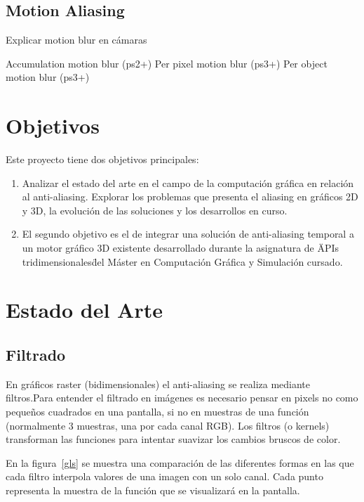 \documentclass[withindex, glossary]{cam-thesis}
\begin{document}
\section{Motion Aliasing}
Explicar motion blur en cámaras

Accumulation motion blur (ps2+)
Per pixel motion blur (ps3+)
Per object motion blur (ps3+)

\chapter{Objetivos}

Este proyecto tiene dos objetivos principales:

\begin{enumerate}
    \item Analizar el estado del arte en el campo de la computación gráfica en relación al anti-aliasing. Explorar los problemas que presenta el aliasing en gráficos 2D y 3D, la evolución de las soluciones y los desarrollos en curso.
    \item El segundo objetivo es el de integrar una solución de anti-aliasing temporal a un motor gráfico 3D existente desarrollado durante la asignatura de \"APIs tridimensionales\" del Máster en Computación Gráfica y Simulación cursado.
\end{enumerate}

\chapter{Estado del Arte}

\section{Filtrado}
\label{filtros}

En gráficos raster (bidimensionales) el anti-aliasing se realiza mediante filtros.Para entender el filtrado en imágenes es necesario pensar en pixels no como pequeños cuadrados en una pantalla, si no en muestras de una función (normalmente 3 muestras, una por cada canal RGB)\cite{Smith95apixel}. Los filtros (o kernels) transforman las funciones para intentar suavizar los cambios bruscos de color.

En la figura~\ref{gls} se muestra una comparación de las diferentes formas en las que cada filtro interpola valores de una imagen con un solo canal. Cada punto representa la muestra de la función que se visualizará en la pantalla.

\end{document}
